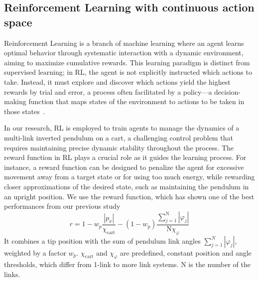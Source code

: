 \subsection{Reinforcement Learning with continuous action space} \label{subsec: Reinforcement Learning with continuous action space}
Reinforcement Learning is a branch of machine learning where an agent learns optimal behavior through systematic interaction with a dynamic environment, aiming to maximize cumulative rewards. This learning paradigm is distinct from supervised learning; in RL, the agent is not explicitly instructed which actions to take. Instead, it must explore and discover which actions yield the highest rewards by trial and error, a process often facilitated by a policy—a decision-making function that maps states of the environment to actions to be taken in those states~\cite{sutton_reinforcement_2018}.

In our research, RL is employed to train agents to manage the dynamics of a multi-link inverted pendulum on a cart, a challenging control problem that requires maintaining precise dynamic stability throughout the process. The reward function in RL plays a crucial role as it guides the learning process. For instance, a reward function can be designed to penalize the agent for excessive movement away from a target state or for using too much energy, while rewarding closer approximations of the desired state, such as maintaining the pendulum in an upright position. We use the reward function, which has shown one of the best performances from our previous study
\begin{equation}
r = 1 - w_p \frac{\left|p_x\right|}{\chi_\mathrm{cart}} - (1-w_p) \frac{\sum_{j=1}^\mathrm{N} \left|\varphi_j\right|}{\mathrm{N} \chi_{\varphi}} 
\label{eq:reward}
\end{equation}
It combines a tip position with the sum of pendulum link angles $\sum_{j=1}^{N} \left|\varphi_j\right|$, weighted by a factor $w_p$. $\chi_\mathrm{cart}$ and $\chi_{\varphi}$ are predefined, constant position and angle thresholds, which differ from 1-link to more link systems. $\mathrm{N}$ is the number of the links.

